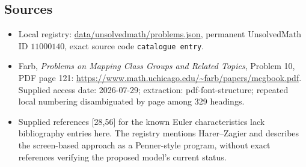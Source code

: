 \documentclass[11pt]{article}
\begin{document}
\subsection{Sources}
\begin{itemize}
\item Local registry: \url{data/unsolvedmath/problems.json}, permanent UnsolvedMath ID $11000140$, exact source code \texttt{catalogue entry}.
\item Farb, \emph{Problems on Mapping Class Groups and Related Topics}, Problem 10, PDF page 121: \url{https://www.math.uchicago.edu/~farb/papers/mcgbook.pdf}. Supplied access date: 2026-07-29; extraction: pdf-font-structure; repeated local numbering disambiguated by page among 329 headings.
\item Supplied references [28,56] for the known Euler characteristics lack bibliography entries here. The registry mentions Harer--Zagier and describes the screen-based approach as a Penner-style program, without exact references verifying the proposed model's current status.
\end{itemize}
\end{document}
